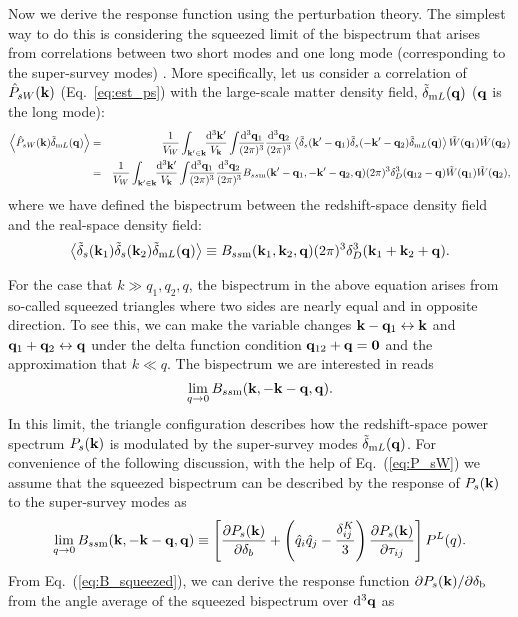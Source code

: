 \documentclass[prd,onecolumn,notitlepage,amsmath,amssymb,floatfix,superscriptaddress]{revtex4-1}
\newcommand{\bk}{{\bf k}}
\newcommand{\bq}{{\bf q}}
\newcommand{\hq}{\hat{q}}
\newcommand{\tdelta}{\tilde{\delta}}
\newcommand{\tW}{\tilde{W}}
\newcommand{\br}{{\rm b}}
\newcommand{\tdml}{\tilde{\delta}_{{\rm m}L}}
\def\avrg#1{\left\langle #1 \right\rangle}
\begin{document}
Now we derive the response function using the perturbation theory.
The simplest way to do this is considering the squeezed limit of the bispectrum that arises from correlations 
between two short modes and one long mode (corresponding to the super-survey modes) \cite{Chiangetal:14}. 
More specifically, 
let us consider a correlation of $\hat{P}_{sW}(\bk)$ (Eq.~\ref{eq:est_ps}) with the large-scale matter density field, 
$\tdml(\bq)$ ($\bq$ is the long mode):
%
\begin{eqnarray}
\avrg{\hat{P}_{sW}(\bk)\tdml(\bq)}&=&\frac{1}{V_W}\int_{\bk'\in \bk}\!\!\frac{\mathrm{d}^3\bk'}{V_\bk}
\int\!\!\frac{\mathrm{d}^3\bq_1}{(2\pi)^3}\frac{\mathrm{d}^3\bq_2}{(2\pi)^3}
\avrg{\tdelta_s(\bk'-\bq_1)\tdelta_s(-\bk'-\bq_2)\tdml(\bq)}\tW(\bq_1)\tW(\bq_2)\nonumber\\
&=& \frac{1}{V_W}\int_{\bk'\in \bk}\!\!\frac{\mathrm{d}^3\bk'}{V_\bk}
\int\!\!\frac{\mathrm{d}^3\bq_1}{(2\pi)^3}\frac{\mathrm{d}^3\bq_2}{(2\pi)^3}
B_{ss{\rm m}}(\bk'-\bq_1,-\bk'-\bq_2,\bq)(2\pi)^3\delta_D^3(\bq_{12}-\bq)\tW(\bq_1)\tW(\bq_2),
\label{eq:ps_dq}
\end{eqnarray}
%
where we have defined the bispectrum between the redshift-space density field and the real-space density field:
%
\begin{equation}
\avrg{\tdelta_s(\bk_1)\tdelta_s(\bk_2)\tdml(\bq)}\equiv B_{ss{\rm m}}(\bk_1,\bk_2,\bq)(2\pi)^3\delta_D^3(\bk_1+\bk_2+\bq).
\end{equation}

For the case that $k\gg q_1,q_2,q$, 
the bispectrum in the above equation arises from so-called squeezed triangles where two sides are nearly equal and in opposite direction. 
To see this, we can make the variable changes $\bk-\bq_1\leftrightarrow \bk$ and $\bq_1+\bq_2\leftrightarrow \bq$ 
under the delta function condition $\bq_{12}+\bq={\bf 0}$ and the approximation that $k\ll q$. The bispectrum we are interested in reads
%
\begin{equation}
\lim_{q\rightarrow 0}B_{ss{\rm m}}(\bk,-\bk-\bq,\bq).
\end{equation}
%
In this limit, the triangle configuration describes how the redshift-space power spectrum $P_s(\bk)$ is modulated 
by the super-survey modes $\tdml(\bq)$. For convenience of the following discussion, 
with the help of Eq.~(\ref{eq:P_sW})
we assume  that the squeezed bispectrum can be 
described by the response of $P_s(\bk)$ to the super-survey modes as
%
\begin{equation}
\lim_{q\rightarrow 0}B_{ss{\rm m}}(\bk,-\bk-\bq,\bq)\equiv \left[\frac{\partial P_s(\bk)}{\partial \delta_b}+
\left(\hq_i\hq_j-\frac{\delta^K_{ij}}{3}\right)\frac{\partial P_s(\bk)}{\partial \tau_{ij}}\right] P^L(q).
\label{eq:B_squeezed}
\end{equation}
%
From Eq.~(\ref{eq:B_squeezed}), we can derive the response function 
$\partial P_s(\bk)/\partial \delta_\br$
from the 
angle average of the squeezed bispectrum over $\mathrm{d}^3\bq$ as
\end{document}
